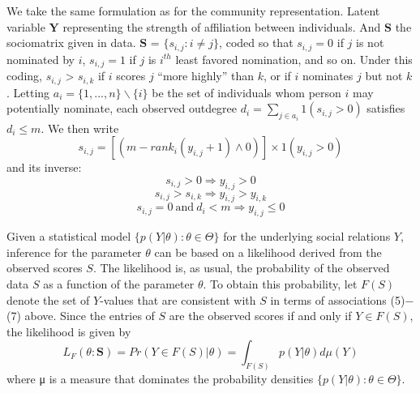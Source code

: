 \documentclass[12pt]{ociamthesis}  %
\begin{document}
	We take the same formulation as for the community representation. Latent variable $\textbf{Y}$ representing the strength of affiliation between individuals. And $\textbf{S}$ the sociomatrix given in data. $\textbf{S}$ =
	$\{ s_{i,j} : i \neq j\}$, coded so that $s_{i,j} = 0$ if $j$ is not nominated by $i$, $s_{i,j} = 1$ if $j$ is $i^{th}$ least favored
	nomination, and so on. Under this coding, $s_{i,j}$ > $s_{i,k}$ if $i$ scores $j$ “more highly” than $k$, or if $i$
	nominates $j$ but not $k$. Letting $a_{i} = \{1, ..., n\} \backslash \{i\}$ be the set of individuals whom person $i$ may potentially nominate, each observed outdegree $d_{i} = \sum_{j \in a_{i}} 1(s_{i,j} > 0)$ satisfies $d_{i} \leq m$.
	We then write
	\begin{equation}
	s_{i,j} = [(m-rank_{i}(y_{i,j} + 1) \wedge 0)] \times 1(y_{i,j} > 0 )
	\end{equation}
	and its inverse:
	\begin{equation}
	s_{i,j} > 0 \Rightarrow y_{i,j} > 0
	\end{equation}
	\begin{equation}
	s_{i,j} > s_{i,k} \Rightarrow y_{i,j} > y_{i,k}
	\end{equation}
	\begin{equation}
	s_{i,j} = 0 \ \text{and} \ d_{i} < m \Rightarrow y_{i,j} \leq 0
	\end{equation}
	
	Given a statistical model $\{p(Y|\theta) : \theta \in \Theta \}$ for the underlying social relations $Y$, inference for
	the parameter $\theta$ can be based on a likelihood derived from the observed scores $S$. The likelihood is, as usual, the probability of the observed data $S$ as a function of the parameter $\theta$. To obtain this probability, let $F(S)$ denote the set of $Y$-values that are consistent with $S$ in terms of associations (5)$-$(7) above. Since the entries of $S$ are the observed scores if and only if $Y \in F(S)$, the likelihood is given by
	\begin{equation}
	L_{F}(\theta : \textbf{S}) = Pr(Y \in F(S) | \theta) = \int_{F(S)} p(Y|\theta) d\mu(Y)
	\end{equation}
	where μ is a measure that dominates the probability densities $\{p(Y|\theta) : \theta \in \Theta \}$.
	
\end{document}

